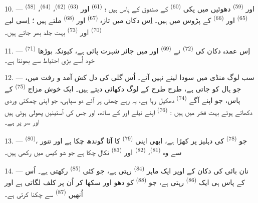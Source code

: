 \VUsaut{4.0mm}
\VUsaut{3.0mm}

10. ---  \textsuperscript{(58)} اور 
\textsuperscript{(59)} دھوئیں میں پکی 
\textsuperscript{(60)} کے صندوق کے پاس ہیں ؛ 
\textsuperscript{(61)} اور  \textsuperscript{(63)}
 \textsuperscript{(62)}، 
\textsuperscript{(64)}،  \textsuperscript{(65)}
اور  \textsuperscript{(66)} کے پڑوس میں ہیں۔ اِس دکان میں
تازہ  \textsuperscript{(67)} اور 
\textsuperscript{(68)} ملتے ہیں ؛ اِسی لیے 
\textsuperscript{(70)} اور 
\textsuperscript{(73)} بہت جلد بھر جاتے ہیں۔

11. --- اِس عمدہ دکان کی  \textsuperscript{(72)} نے
 \textsuperscript{(69)} اور  میں
جائز شہرت پائی ہے، کیونکہ بوڑھا  \textsuperscript{(71)}
خود اُسے بڑی احتیاط سے بھونتا ہے۔

\VUsaut{4.0mm}
\VUsaut{3.0mm}

12. --- سب لوگ منڈی میں سودا لینے نہیں آتے۔ اُس گلی کی دل کش آمد و
رفت میں، جو ہال کو جاتی ہے، طرح طرح کے لوگ دکھائی دیتے ہیں۔ ایک خوش
مزاج  \textsuperscript{(75)} کے پاس، جو اپنے آگے
 \textsuperscript{(74)} دھکیل رہا ہے، یہ رہے چھٹی پر آئے
دو سپاہی، جو اپنی چمکتی وردی دکھاتے ہوئے بہت فخر میں ہیں :
 \textsuperscript{(76)} اپنے نیلے  اور
 کے ساتھ، اور  جس کی
آستینیں پھولی ہوئی ہیں اور سر پر  ہے۔

13. ---  \textsuperscript{(80)}، جو  \textsuperscript{(78)} کی دہلیز پر کھڑا ہے، ابھی اپنی
 \textsuperscript{(79)} کا آٹا گوندھ چکا ہے اور تنور سے
وہ  \textsuperscript{(81)}،  \textsuperscript{(82)} اور 
\textsuperscript{(83)} نکال چکا ہے جو شو کیس میں رکھی ہیں۔

14. --- نان بائی کی دکان کے اوپر ایک ماہر 
\textsuperscript{(84)} رہتی ہے، جو کئی 
\textsuperscript{(85)} رکھتی ہے۔ اُس کے پاس ہی ایک  \textsuperscript{(86)} رہتی ہے، جو 
\textsuperscript{(88)} کو دھو اور سکھا کر اُن پر کلف لگاتی ہے اور
اُنھیں  \textsuperscript{(87)} سے چکنا کرتی ہے۔


